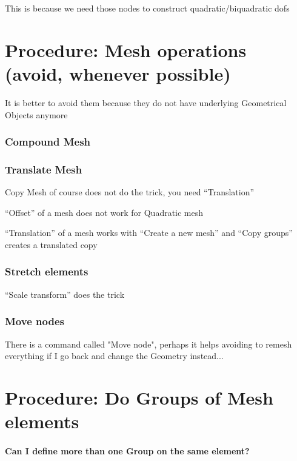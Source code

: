 \documentclass[10pt]{book}
\begin{document}
  This is because we need those nodes to construct quadratic/biquadratic dofs
  
  
  
  \chapter{Procedure: Mesh operations (avoid, whenever possible)}
  
   It is better to avoid them because they do not have underlying Geometrical Objects anymore
   

   
\subsection{Compound Mesh}
   
   
   
\subsection{Translate Mesh}

 
 Copy Mesh of course does not do the trick, you need ``Translation''
 
 ``Offset'' of a mesh does not work for Quadratic mesh
 
 ``Translation'' of a mesh works with ``Create a new mesh'' and ``Copy groups'' creates a translated copy


\subsection{Stretch elements}

  ``Scale transform'' does the trick

   
 \subsection{Move nodes}


 There is a command called "Move node", perhaps it helps avoiding to remesh everything if I go back and change the Geometry instead...



  
  
  \chapter{Procedure: Do Groups of Mesh elements}
 

\subsubsection{Can I define more than one Group on the same element?}
\end{document}
